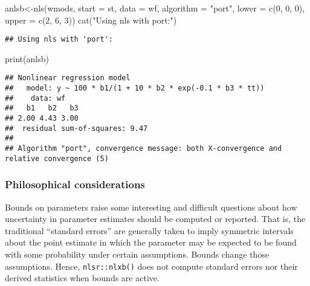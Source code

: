 \documentclass[
]{article}
\newenvironment{Shaded}{\begin{snugshade}}{\end{snugshade}}
\newcommand{\AttributeTok}[1]{\textcolor[rgb]{0.77,0.63,0.00}{#1}}
\newcommand{\DecValTok}[1]{\textcolor[rgb]{0.00,0.00,0.81}{#1}}
\newcommand{\FunctionTok}[1]{\textcolor[rgb]{0.00,0.00,0.00}{#1}}
\newcommand{\NormalTok}[1]{#1}
\newcommand{\OtherTok}[1]{\textcolor[rgb]{0.56,0.35,0.01}{#1}}
\newcommand{\StringTok}[1]{\textcolor[rgb]{0.31,0.60,0.02}{#1}}
\begin{document}
\begin{Shaded}
\begin{Highlighting}[]
\NormalTok{anlsb}\OtherTok{\textless{}{-}}\FunctionTok{nls}\NormalTok{(wmods, }\AttributeTok{start =}\NormalTok{ st, }\AttributeTok{data =}\NormalTok{ wf, }\AttributeTok{algorithm =} \StringTok{"port"}\NormalTok{, }\AttributeTok{lower =} \FunctionTok{c}\NormalTok{(}\DecValTok{0}\NormalTok{, }\DecValTok{0}\NormalTok{, }\DecValTok{0}\NormalTok{), }\AttributeTok{upper =} \FunctionTok{c}\NormalTok{(}\DecValTok{2}\NormalTok{, }\DecValTok{6}\NormalTok{, }\DecValTok{3}\NormalTok{))}
\FunctionTok{cat}\NormalTok{(}\StringTok{"Using nls with \textquotesingle{}port\textquotesingle{}:"}\NormalTok{)}
\end{Highlighting}
\end{Shaded}

\begin{verbatim}
## Using nls with 'port':
\end{verbatim}

\begin{Shaded}
\begin{Highlighting}[]
\FunctionTok{print}\NormalTok{(anlsb)}
\end{Highlighting}
\end{Shaded}

\begin{verbatim}
## Nonlinear regression model
##   model: y ~ 100 * b1/(1 + 10 * b2 * exp(-0.1 * b3 * tt))
##    data: wf
##   b1   b2   b3 
## 2.00 4.43 3.00 
##  residual sum-of-squares: 9.47
## 
## Algorithm "port", convergence message: both X-convergence and relative convergence (5)
\end{verbatim}

\hypertarget{philosophical-considerations}{%
\subsubsection{Philosophical
considerations}\label{philosophical-considerations}}

Bounds on parameters raise some interesting and difficult questions
about how uncertainty in parameter estimates should be computed or
reported. That is, the traditional ``standard errors'' are generally
taken to imply symmetric intervals about the point estimate in which the
parameter may be expected to be found with some probability under
certain assumptions. Bounds change those assumptions. Hence,
\texttt{nlsr::nlxb()} does not compute standard errors nor their derived
statistics when bounds are active.
\end{document}
